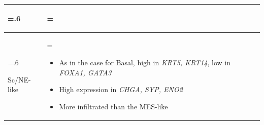 \begin{table}[htbp]
\begin{tabularx}{\textwidth}{>{\hsize=.6\hsize\raggedright\arraybackslash}X >{\hsize=\hsize\arraybackslash}X}
\begin{itemize}[leftmargin=*, nosep, after=\vspace{-\baselineskip}]
    \end{itemize} \\
    \midrule
    Sc/NE-like & 
    \begin{itemize}[leftmargin=*, nosep, after=\vspace{-\baselineskip}]
        \item As in the case for Basal, high in \textit{KRT5, KRT14}, low in \textit{FOXA1, GATA3}
        \item High expression in\textit{ CHGA, SYP, ENO2}
        \item More infiltrated than the MES-like
    \end{itemize} \\
    \bottomrule
    \end{tabularx}
    \label{tab:lit:lund_genes}
\end{table}

